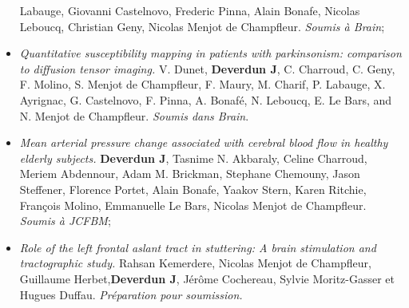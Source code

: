 \begin{itemize}
 Labauge, Giovanni Castelnovo, Frederic Pinna, Alain Bonafe, Nicolas Leboucq, Christian Geny,
Nicolas Menjot de Champfleur. {\em Soumis à Brain};
\item {\em Quantitative susceptibility mapping in patients with parkinsonism: comparison to diffusion
   tensor imaging.} V. Dunet, {\bf Deverdun J}, C. Charroud, C. Geny, F. Molino, S. Menjot de
  Champfleur, F. Maury, M. Charif, P. Labauge, X. Ayrignac, G. Castelnovo, F. Pinna, A. Bonafé,
  N. Leboucq, E. Le Bars, and N. Menjot de Champfleur. {\em Soumis dans Brain}.
\item {\em Mean arterial pressure change associated with cerebral blood flow in healthy elderly subjects.}
   {\bf Deverdun J}, Tasnime N. Akbaraly, Celine Charroud, Meriem Abdennour, Adam M.
  Brickman, Stephane Chemouny, Jason Steffener, Florence Portet, Alain Bonafe, Yaakov Stern,
 Karen Ritchie, François Molino, Emmanuelle Le Bars, Nicolas Menjot de Champfleur. {\em Soumis à
  JCFBM};
\item {\em Role of the left frontal aslant tract in stuttering: A brain stimulation and tractographic study.}
   Rahsan Kemerdere, Nicolas Menjot de Champfleur, Guillaume Herbet,{\bf Deverdun J},
    Jérôme Cochereau, Sylvie Moritz-Gasser et Hugues Duffau. {\em Préparation pour soumission.}
\end{itemize}
















{}
